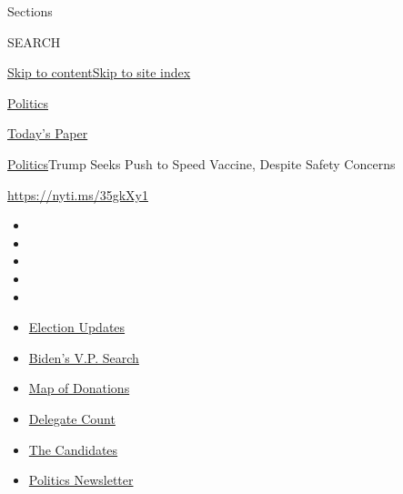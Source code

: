 Sections

SEARCH

\protect\hyperlink{site-content}{Skip to
content}\protect\hyperlink{site-index}{Skip to site index}

\href{https://www.nytimes.com/section/politics}{Politics}

\href{https://myaccount.nytimes.com/auth/login?response_type=cookie\&client_id=vi}{}

\href{https://www.nytimes.com/section/todayspaper}{Today's Paper}

\href{/section/politics}{Politics}\textbar{}Trump Seeks Push to Speed
Vaccine, Despite Safety Concerns

\url{https://nyti.ms/35gkXy1}

\begin{itemize}
\item
\item
\item
\item
\item
\end{itemize}

\begin{itemize}
\item
  \href{https://www.nytimes.com/2020/07/31/us/elections/biden-vs-trump.html?action=click\&pgtype=Article\&state=default\&region=TOP_BANNER\&context=storylines_menu}{Election
  Updates}
\item
  \href{https://www.nytimes.com/article/biden-vice-president-2020.html?action=click\&pgtype=Article\&state=default\&region=TOP_BANNER\&context=storylines_menu}{Biden's
  V.P. Search}
\item
  \href{https://www.nytimes.com/interactive/2020/07/24/us/politics/trump-biden-campaign-donors.html?action=click\&pgtype=Article\&state=default\&region=TOP_BANNER\&context=storylines_menu}{Map
  of Donations}
\item
  \href{https://www.nytimes.com/interactive/2020/us/elections/delegate-count-primary-results.html?action=click\&pgtype=Article\&state=default\&region=TOP_BANNER\&context=storylines_menu}{Delegate
  Count}
\item
  \href{https://www.nytimes.com/interactive/2019/us/politics/2020-presidential-candidates.html?action=click\&pgtype=Article\&state=default\&region=TOP_BANNER\&context=storylines_menu}{The
  Candidates}
\item
  \href{https://www.nytimes.com/newsletters/politics?action=click\&pgtype=Article\&state=default\&region=TOP_BANNER\&context=storylines_menu}{Politics
  Newsletter}
\end{itemize}

